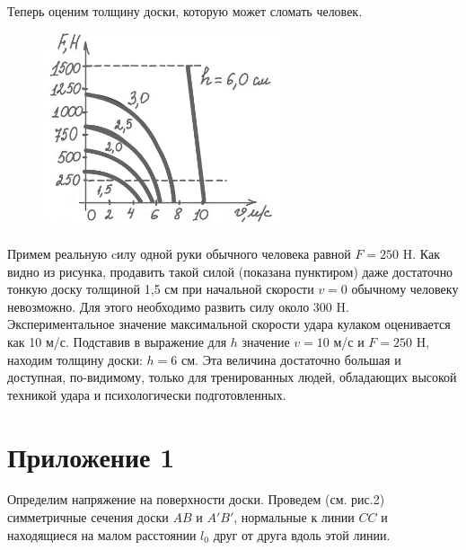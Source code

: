 \documentclass[a4paper,12pt]{article} %
\begin{document}
Теперь оценим толщину доски, которую может сломать человек. \begin{figure}
\includegraphics[width=7cm]{pictures/3.PNG}
\label{fig:image}
\end{figure}
Примем реальную cилу одной руки обычного человека равной $F = 250$ H. Как видно из рисунка, продавить такой силой (показана пунктиром) даже достаточно тонкую доску толщиной 1,5 см при начальной скорости $v = 0$ обычному человеку невозможно. Для этого необходимо развить силу около 300 H. Экспериментальное значение максимальной скорости удара кулаком оценивается как 10 м/с. Подставив в выражение для $h$ значение $v = 10$ м/с и $F = 250$ H, находим толщину доски: $h = 6$ см. Эта величина достаточно большая и доступная, по-видимому, только для тренированных людей, обладающих высокой техникой удара и психологически подготовленных.

\newpage
\section*{Приложение 1}

Определим напряжение на поверхности доски. Проведем (см. рис.2) симметричные сечения доски $AB$ и $A'B'$, нормальные к линии $CC$ и находящиеся на малом расстоянии $l_0$ друг от друга вдоль этой линии. 
\end{document}
